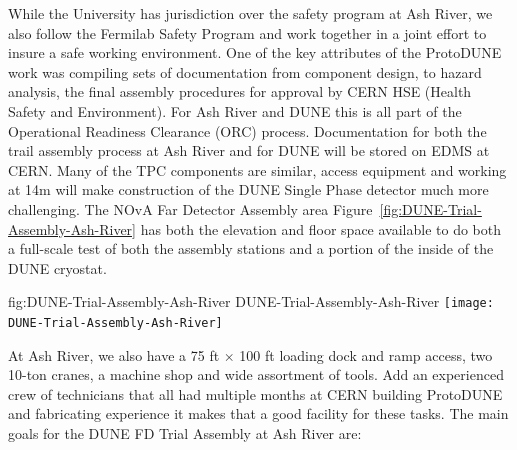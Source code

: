 While the University has jurisdiction over the safety program at Ash River, we also follow the Fermilab Safety Program and work together in a joint effort to insure a safe working environment.  One of the key attributes of the ProtoDUNE work was compiling sets of documentation from component design, to hazard analysis, the final assembly procedures for approval by CERN HSE (Health Safety and Environment). For Ash River and DUNE this is all part of the Operational Readiness Clearance (ORC) process. Documentation for both the trail assembly process at Ash River and for DUNE will be stored on EDMS at CERN. 
Many of the TPC components are similar, access equipment and working at 14m will make construction of the DUNE Single Phase detector much more challenging.   The NOvA Far Detector Assembly area Figure~\ref{fig:DUNE-Trial-Assembly-Ash-River} has both the elevation and floor space available to do both a full-scale test of both the assembly stations and a portion of the inside of the DUNE cryostat. 

\begin{dunefigure} %
{fig:DUNE-Trial-Assembly-Ash-River}  %
{DUNE-Trial-Assembly-Ash-River}  %
\centering
\texttt{[image: DUNE-Trial-Assembly-Ash-River]}
\end{dunefigure}


At Ash River, we also have a 75 \si{ft} $\times$  100 \si{ft} loading dock and ramp access, two 10-ton cranes, a machine shop and wide assortment of tools.  Add an experienced crew of technicians that all had multiple months at CERN building ProtoDUNE and fabricating experience it makes that a good facility for these tasks. 
The main goals for the DUNE FD Trial Assembly at Ash River are:

